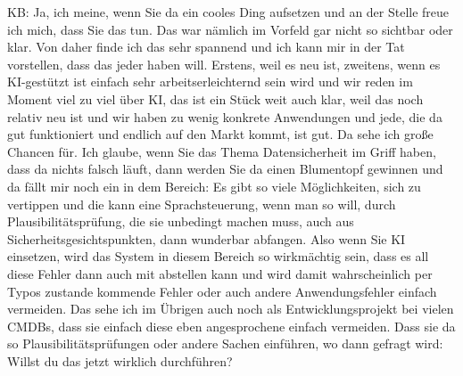 \begin{list}{X:}{\setlength{\labelsep}{5mm}}
\item[KB:] Ja, ich meine, wenn Sie da ein cooles Ding aufsetzen und an der Stelle freue ich mich, dass Sie das tun. Das war nämlich im Vorfeld gar nicht so sichtbar oder klar. Von daher finde ich das sehr spannend und ich kann mir in der Tat vorstellen, dass das jeder haben will. Erstens, weil es neu ist, zweitens, wenn es KI-gestützt ist einfach sehr arbeitserleichternd sein wird und wir reden im Moment viel zu viel über KI, das ist ein Stück weit auch klar, weil das noch relativ neu ist und wir haben zu wenig konkrete Anwendungen und jede, die da gut funktioniert und endlich auf den Markt kommt, ist gut. Da sehe ich große Chancen für. Ich glaube, wenn Sie das Thema Datensicherheit im Griff haben, dass da nichts falsch läuft, dann werden Sie da einen Blumentopf gewinnen und da fällt mir noch ein in dem Bereich: Es gibt so viele Möglichkeiten, sich zu vertippen und die kann eine Sprachsteuerung, wenn man so will, durch Plausibilitätsprüfung, die sie unbedingt machen muss, auch aus Sicherheitsgesichtspunkten, dann wunderbar abfangen. Also wenn Sie KI einsetzen, wird das System in diesem Bereich so wirkmächtig sein, dass es all diese Fehler dann auch mit abstellen kann und wird damit wahrscheinlich per Typos zustande kommende Fehler oder auch andere Anwendungsfehler einfach vermeiden. Das sehe ich im Übrigen auch noch als Entwicklungsprojekt bei vielen CMDBs, dass sie einfach diese eben angesprochene einfach vermeiden. Dass sie da so Plausibilitätsprüfungen oder andere Sachen einführen, wo dann gefragt wird: Willst du das jetzt wirklich durchführen?  
\end{list}
